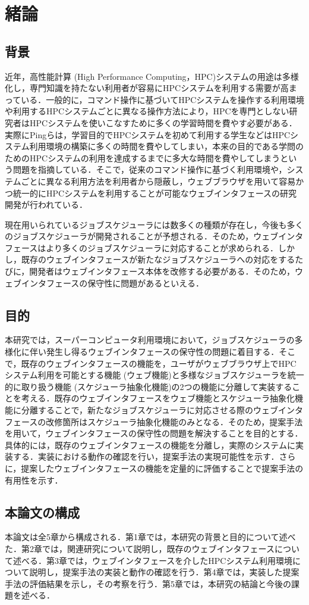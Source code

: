 
\section{緒論}
\subsection{背景}
近年，高性能計算 (High Performance Computing，HPC)システムの用途は多様化し，専門知識を持たない利用者が容易にHPCシステムを利用する需要が高まっている．一般的に，コマンド操作に基づいてHPCシステムを操作する利用環境や利用するHPCシステムごとに異なる操作方法により，HPCを専門としない研究者はHPCシステムを使いこなすために多くの学習時間を費やす必要がある．実際にPingらは，学習目的でHPCシステムを初めて利用する学生などはHPCシステム利用環境の構築に多くの時間を費やしてしまい，本来の目的である学問のためのHPCシステムの利用を達成するまでに多大な時間を費やしてしまうという問題を指摘している\cite{cite1}．そこで，従来のコマンド操作に基づく利用環境や，システムごとに異なる利用方法を利用者から隠蔽し，ウェブブラウザを用いて容易かつ統一的にHPCシステムを利用することが可能なウェブインタフェースの研究開発が行われている\cite{OOD_1}．\par
現在用いられているジョブスケジューラには数多くの種類が存在し，今後も多くのジョブスケジューラが開発されることが予想される．そのため，ウェブインタフェースはより多くのジョブスケジューラに対応することが求められる．しかし，既存のウェブインタフェースが新たなジョブスケジューラへの対応をするたびに，開発者はウェブインタフェース本体を改修する必要がある．そのため，ウェブインタフェースの保守性に問題があるといえる．\par

\subsection{目的}
本研究では，スーパーコンピュータ利用環境において，ジョブスケジューラの多様化に伴い発生し得るウェブインタフェースの保守性の問題に着目する．そこで，既存のウェブインタフェースの機能を，ユーザがウェブブラウザ上でHPCシステム利用を可能とする機能 (ウェブ機能)と多様なジョブスケジューラを統一的に取り扱う機能 (スケジューラ抽象化機能)の2つの機能に分離して実装することを考える．既存のウェブインタフェースをウェブ機能とスケジューラ抽象化機能に分離することで，新たなジョブスケジューラに対応させる際のウェブインタフェースの改修箇所はスケジューラ抽象化機能のみとなる．そのため，提案手法を用いて，ウェブインタフェースの保守性の問題を解決することを目的とする．具体的には，既存のウェブインタフェースの機能を分離し，実際のシステムに実装する．実装における動作の確認を行い，提案手法の実現可能性を示す．さらに，提案したウェブインタフェースの機能を定量的に評価することで提案手法の有用性を示す．\par

\subsection{本論文の構成}
本論文は全5章から構成される．第1章では，本研究の背景と目的について述べた．第2章では，関連研究について説明し，既存のウェブインタフェースについて述べる．第3章では，ウェブインタフェースを介したHPCシステム利用環境について説明し，提案手法の実装と動作の確認を行う．第4章では，実装した提案手法の評価結果を示し，その考察を行う．第5章では，本研究の結論と今後の課題を述べる．\par

